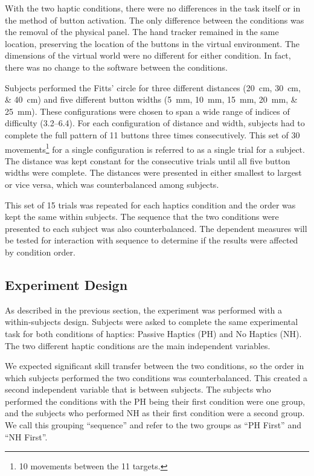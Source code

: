 With the two haptic conditions, there were no differences in the task itself or in the method of button activation.
The only difference between the conditions was the removal of the physical panel.
The hand tracker remained in the same location, preserving the location of the buttons in the virtual environment.
The dimensions of the virtual world were no different for either condition.
In fact, there was no change to the software between the conditions.

Subjects performed the Fitts' circle for three different distances (\SIlist{20;30;40}{\centi\meter}) and five different button widths (\SIlist{5;10;15;20;25}{\milli\meter}).
These configurations were chosen to span a wide range of indices of difficulty (\numrange{3.2}{6.4}).
For each configuration of distance and width, subjects had to complete the full pattern of 11 buttons three times consecutively.
This set of 30 movements\footnote{10 movements between the 11 targets.} for a single configuration is referred to as a single trial for a subject.
The distance was kept constant for the consecutive trials until all five button widths were complete.
The distances were presented in either smallest to largest or vice versa, which was counterbalanced among subjects.

This set of 15 trials was repeated for each haptics condition and the order was kept the same within subjects.
The sequence that the two conditions were presented to each subject was also counterbalanced.
The dependent measures will be tested for interaction with sequence to determine if the results were affected by condition order.

\subsection{Experiment Design}

As described in the previous section, the experiment was performed with a within-subjects design.
Subjects were asked to complete the same experimental task for both conditions of haptics: Passive Haptics (PH) and No Haptics (NH).
The two different haptic conditions are the main independent variables.

We expected significant skill transfer between the two conditions, so the order in which subjects performed the two conditions was counterbalanced.
This created a second independent variable that is between subjects.
The subjects who performed the conditions with the PH being their first condition were one group, and the subjects who performed NH as their first condition were a second group.
We call this grouping ``sequence'' and refer to the two groups as ``PH First'' and ``NH First''.

